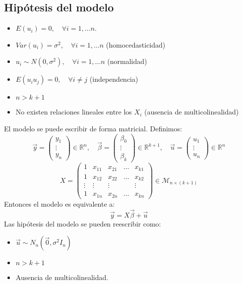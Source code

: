 \documentclass{report}
\theoremstyle{remark}
\theoremstyle{remark}
\theoremstyle{remark}
\theoremstyle{definition}
\theoremstyle{definition}
\theoremstyle{definition}
\begin{document}
\subsection*{Hipótesis del modelo}
\begin{itemize}
    \item $E(u_i) = 0, \quad \forall i = 1, \dots n$.
    \item $Var(u_i) = \sigma^2, \quad \forall i = 1, \dots n$ (homocedasticidad)
    \item $u_i \sim N(0, \sigma^2), \quad \forall i = 1, \dots n$ (normalidad)
    \item $E(u_i u_j) = 0, \quad \forall i \neq j$ (independencia)
    \item $n > k+1$
    \item No existen relaciones lineales entre los $X_i$ (ausencia de multicolinealidad)
\end{itemize}
El modelo se puede escribir de forma matricial.
Definimos:
$$\vec{y} = \begin{pmatrix}
        y_1 \\ \vdots \\ y_n
    \end{pmatrix} \in \mathbb{R}^n, \quad
    \vec{\beta} = \begin{pmatrix}
        \beta_0 \\ \vdots \\ \beta_k
    \end{pmatrix} \in \mathbb{R}^{k+1}, \quad
    \vec{u} = \begin{pmatrix}
        u_1 \\ \vdots \\ u_n
    \end{pmatrix} \in \mathbb{R}^n$$
$$X = \begin{pmatrix}
        1      & x_{11} & x_{21} & \dots & x_{k1} \\
        1      & x_{12} & x_{22} & \dots & x_{k2} \\
        \vdots & \vdots & \vdots &       & \vdots \\
        1      & x_{1n} & x_{2n} & \dots & x_{kn}
    \end{pmatrix} \in \mathcal{M}_{n \times (k+1)}$$
Entonces el modelo es equivalente a:
$$\vec{y} = X\vec{\beta} + \vec{u}$$
Las hipótesis del modelo se pueden reescribir como:
\begin{itemize}
    \item $\vec{u} \sim N_n(\vec{0}, \sigma^2 I_n)$
    \item $n > k+1$
    \item Ausencia de multicolinealidad.
\end{itemize}
\end{document}
